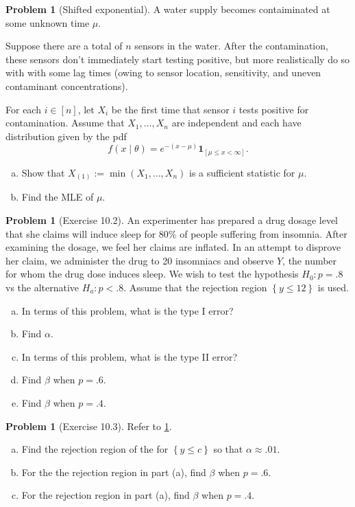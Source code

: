 \documentclass[10pt]{article}
\theoremstyle{definition}
\newtheorem{problem}[theorem]{Problem}
\newcommand{\1}[1]{\textbf{1}_{\left[#1\right]}} %
\begin{document}
\begin{problem}[Shifted exponential]
  A water supply becomes contaiminated at some unknown time $\mu$.
  
  Suppose there are a total of $n$ sensors in the water. After the
  contamination, these sensors don't immediately start testing positive, but
  more realistically do so with with some lag times (owing to sensor location,
  sensitivity, and uneven contaminant concentrations).

  For each $i\in [n]$,
  let $X_{i}$ be the first time that sensor $i$ tests positive for
  contamination. Assume that $X_{1},\ldots,X_{n}$ are independent and each
  have distribution given by the pdf
  \begin{equation*}
    f(x\mid \theta) = e^{-(x-\mu)}\mathbf{1}_{\left[\mu \leq x<\infty\right]}.
  \end{equation*}
  \begin{enumerate}[(a)]
    \item Show that $X_{(1)}:=\min(X_{1},\ldots,X_{n})$ is a sufficient
    statistic for $\mu$. 
    \item Find the MLE of $\mu$.
  \end{enumerate}
\end{problem}


\begin{problem}[Exercise 10.2]
  \label{problem:exercise-10.2}
  An experimenter has prepared a drug dosage level that she claims will induce
  sleep for 80\% of people suffering from insomnia. After examining the
  dosage, we feel her claims are inflated. In an attempt to disprove her
  claim, we administer the drug to 20 insomniacs and observe $Y$, the number
  for whom the drug dose induces sleep. We wish to test the hypothesis
  $H_{0}:p=.8$ vs the alternative $H_{a}:p<.8$. Assume that the rejection
  region $\left\{y \leq 12\right\}$ is used.
  \begin{enumerate}[(a)]
    \item In terms of this problem, what is the type I error?
    \item Find $\alpha$.
    \item In terms of this problem, what is the type II error?
    \item Find $\beta$ when $p=.6$.
    \item Find $\beta$ when $p=.4$.
  \end{enumerate}
\end{problem}


\begin{problem}[Exercise 10.3]
  Refer to \cref{problem:exercise-10.2}.
  \begin{enumerate}[(a)]
    \item Find the rejection region of the for $\left\{y \leq c\right\}$ so
    that $\alpha\approx .01$.
    \item For the the rejection region in part (a), find $\beta$  when $p=.6$.
    \item For the rejection region in part (a), find $\beta$ when $p=.4$.
  \end{enumerate}
\end{problem}
\end{document}
